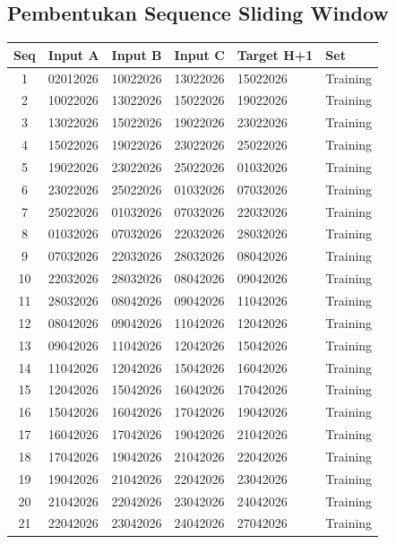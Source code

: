 \documentclass[11pt,a4paper]{article}
\begin{document}
\subsection{Pembentukan Sequence Sliding Window}
\begin{longtable}{clllll}
    \toprule
    \textbf{Seq} & \textbf{Input A} & \textbf{Input B} & \textbf{Input C} & \textbf{Target H+1} & \textbf{Set} \\
    \midrule
    \endhead
    1  & 02012026 & 10022026 & 13022026 & 15022026 & Training \\
    2  & 10022026 & 13022026 & 15022026 & 19022026 & Training \\
    3  & 13022026 & 15022026 & 19022026 & 23022026 & Training \\
    4  & 15022026 & 19022026 & 23022026 & 25022026 & Training \\
    5  & 19022026 & 23022026 & 25022026 & 01032026 & Training \\
    6  & 23022026 & 25022026 & 01032026 & 07032026 & Training \\
    7  & 25022026 & 01032026 & 07032026 & 22032026 & Training \\
    8  & 01032026 & 07032026 & 22032026 & 28032026 & Training \\
    9  & 07032026 & 22032026 & 28032026 & 08042026 & Training \\
    10 & 22032026 & 28032026 & 08042026 & 09042026 & Training \\
    11 & 28032026 & 08042026 & 09042026 & 11042026 & Training \\
    12 & 08042026 & 09042026 & 11042026 & 12042026 & Training \\
    13 & 09042026 & 11042026 & 12042026 & 15042026 & Training \\
    14 & 11042026 & 12042026 & 15042026 & 16042026 & Training \\
    15 & 12042026 & 15042026 & 16042026 & 17042026 & Training \\
    16 & 15042026 & 16042026 & 17042026 & 19042026 & Training \\
    17 & 16042026 & 17042026 & 19042026 & 21042026 & Training \\
    18 & 17042026 & 19042026 & 21042026 & 22042026 & Training \\
    19 & 19042026 & 21042026 & 22042026 & 23042026 & Training \\
    20 & 21042026 & 22042026 & 23042026 & 24042026 & Training \\
    21 & 22042026 & 23042026 & 24042026 & 27042026 & Training \\

\end{longtable}
\end{document}
